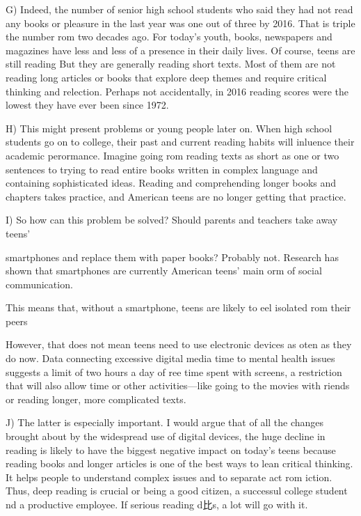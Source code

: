 \documentclass[UTF8,11pt]{ctexart}
\begin{document}
G) Indeed, the number of senior high school students who said they had not read any books or pleasure in the last year was one out of three by 2016. That is triple the number rom two decades ago. For today's youth, books, newspapers and magazines have less and less of a presence in their daily lives. Of course, teens are still reading But they are generally reading short texts. Most of them are not reading long articles or books that explore deep themes and require critical thinking and relection. Perhaps not accidentally, in 2016 reading scores were the lowest they have ever been since 1972.


H) This might present problems or young people later on. When high school students go on to college, their past and current reading habits will inluence their academic perormance. Imagine going rom reading texts as short as one or two sentences to trying to read entire books written in complex language and containing sophisticated ideas. Reading and comprehending longer books and chapters takes practice, and American teens are no longer getting that practice.


I) So how can this problem be solved? Should parents and teachers take away teens'


smartphones and replace them with paper books? Probably not. Research has shown that smartphones are currently American teens' main orm of social communication.


This means that, without a smartphone, teens are likely to eel isolated rom their peers


However, that does not mean teens need to use electronic devices as oten as they do now. Data connecting excessive digital media time to mental health issues suggests a limit of two hours a day of ree time spent with screens, a restriction that will also allow time or other activities—like going to the movies with riends or reading longer, more complicated texts.


J) The latter is especially important. I would argue that of all the changes brought about by the widespread use of digital devices, the huge decline in reading is likely to have the biggest negative impact on today's teens because reading books and longer articles is one of the best ways to lean critical thinking. It helps people to understand complex issues and to separate act rom iction. Thus, deep reading is crucial or being a good citizen, a successul college student nd a productive employee. If serious reading d比s, a lot will go with it.
\end{document}
